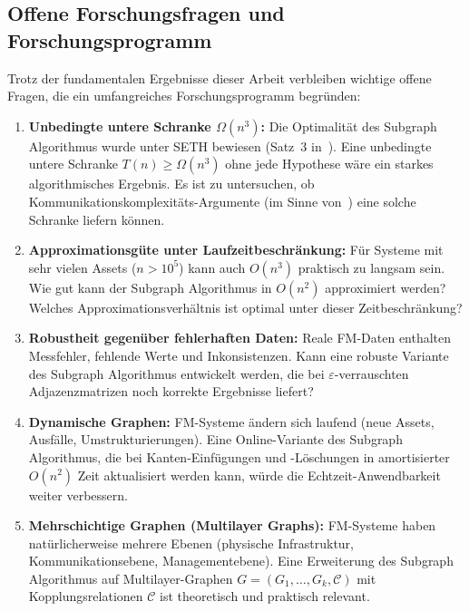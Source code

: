 ﻿\documentclass[a4paper,12pt]{article}
\theoremstyle{definition}
\begin{document}
\subsection{Offene Forschungsfragen und Forschungsprogramm}

Trotz der fundamentalen Ergebnisse dieser Arbeit verbleiben wichtige
offene Fragen, die ein umfangreiches Forschungsprogramm begründen:

\begin{enumerate}

\item \textbf{Unbedingte untere Schranke $\Omega(n^3)$:}
      Die Optimalität des Subgraph Algorithmus wurde unter SETH bewiesen
      (Satz~3 in~\cite{epp2026subgraph}). Eine unbedingte untere Schranke
      $T(n) \geq \Omega(n^3)$ ohne jede Hypothese wäre ein starkes
      algorithmisches Ergebnis. Es ist zu untersuchen, ob
      Kommunikationskomplexitäts-Argumente (im Sinne von~\cite{kushilevitz1997})
      eine solche Schranke liefern können.

\item \textbf{Approximationsgüte unter Laufzeitbeschränkung:}
      Für Systeme mit sehr vielen Assets ($n > 10^5$) kann auch $O(n^3)$
      praktisch zu langsam sein. Wie gut kann der Subgraph Algorithmus in
      $O(n^2)$ approximiert werden? Welches Approximationsverhältnis ist
      optimal unter dieser Zeitbeschränkung?

\item \textbf{Robustheit gegenüber fehlerhaften Daten:}
      Reale FM-Daten enthalten Messfehler, fehlende Werte und Inkonsistenzen.
      Kann eine robuste Variante des Subgraph Algorithmus entwickelt werden,
      die bei $\varepsilon$-verrauschten Adjazenzmatrizen noch korrekte
      Ergebnisse liefert?

\item \textbf{Dynamische Graphen:}
      FM-Systeme ändern sich laufend (neue Assets, Ausfälle, Umstrukturierungen).
      Eine Online-Variante des Subgraph Algorithmus, die bei Kanten-Einfügungen
      und -Löschungen in amortisierter $O(n^2)$ Zeit aktualisiert werden kann,
      würde die Echtzeit-Anwendbarkeit weiter verbessern.

\item \textbf{Mehrschichtige Graphen (Multilayer Graphs):}
      FM-Systeme haben natürlicher\-weise mehrere Ebenen (physische Infrastruktur,
      Kommunikationsebene, Managementebene). Eine Erweiterung des Subgraph
      Algorithmus auf Multilayer-Graphen $G = (G_1, \ldots, G_k, \mathcal{C})$
      mit Kopplungsrelationen $\mathcal{C}$ ist theoretisch und praktisch relevant.


\end{enumerate}
\end{document}
